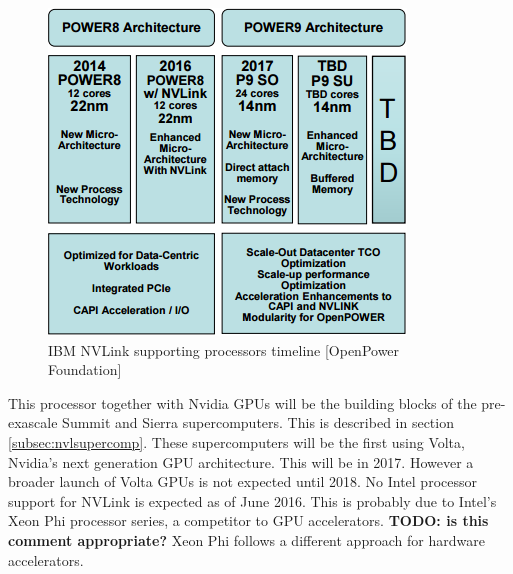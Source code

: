\begin{figure}[ht!]
    \centering
    \includegraphics[width=\linewidth]{NVLink_Power}
    \caption{IBM NVLink supporting processors timeline [OpenPower Foundation]}
    \label{fig:nvlpower}
\end{figure}

This processor together with Nvidia GPUs will be the building blocks of the pre-exascale Summit and Sierra supercomputers.
This is described in section \ref{subsec:nvlsupercomp}.
These supercomputers will be the first using Volta, Nvidia's next generation GPU architecture.
This will be in 2017.
However a broader launch of Volta GPUs is not expected until 2018.
No Intel processor support for NVLink is expected as of June 2016.
This is probably due to Intel's Xeon Phi processor series, a competitor to GPU accelerators. \textbf{TODO: is this comment appropriate?}
Xeon Phi follows a different approach for hardware accelerators.

